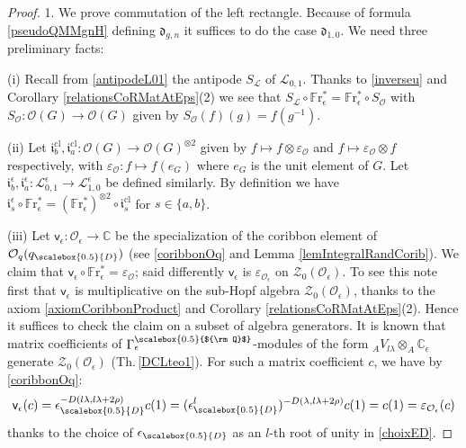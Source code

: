 \documentclass[11pt]{amsart}
\newcommand{\e}{\epsilon}
\newcommand{\qD}{q_{\scalebox{0.5}{D}}}
\newcommand{\eD}{\epsilon_{\scalebox{0.5}{D}}}
\newcommand{\Q}{{\scalebox{0.5}{${\rm Q}$}}}
\begin{document}
\begin{proof}
1. We prove commutation of the left rectangle. Because of formula \eqref{pseudoQMMgnH} defining $\mathfrak{d}_{g,n}$ it suffices to do the case $\mathfrak{d}_{1,0}$. We need three preliminary facts:

\indent (i) Recall from \eqref{antipodeL01} the antipode $S_{\mathcal{L}}$ of $\mathcal{L}_{0,1}$. Thanks to \eqref{inverseu} and Corollary \ref{relationsCoRMatAtEps}(2) we see that $S_{\mathcal{L}} \circ \mathbb{F}\mathrm{r}_\e^* = \mathbb{F}\mathrm{r}_\e^* \circ S_{\mathcal{O}}$ with $S_{\mathcal{O}} : \mathcal{O}(G) \to \mathcal{O}(G)$ given by $S_{\mathcal{O}}(f)(g) = f(g^{-1})$. 

\indent (ii) Let $\mathfrak{i}^{\mathrm{cl}}_{b}, \mathfrak{i}^{\mathrm{cl}}_{a} :\mathcal{O}(G) \to \mathcal{O}(G)^{\otimes 2}$ given by $f \mapsto f \otimes \varepsilon_{\mathcal{O}}$ and $f \mapsto \varepsilon_{\mathcal{O}} \otimes f$ respectively, with $\varepsilon_{\mathcal{O}} : f \mapsto f(e_G)$ where $e_G$ is the unit element of $G$. Let $\mathfrak{i}^{\e}_b, \mathfrak{i}^{\e}_a : \mathcal{L}_{0,1}^\e \to \mathcal{L}_{1,0}^\e$ be defined similarly. By definition we have $\mathfrak{i}^\e_s \circ \mathbb{F}\mathrm{r}_\e^* = (\mathbb{F}\mathrm{r}_\e^*)^{\otimes 2} \circ \mathfrak{i}_s^{\mathrm{cl}}$ for $s \in \{a,b\}$.

\indent (iii) Let $\mathsf{v}_{\e} : \mathcal{O}_{\e} \to \mathbb{C}$ be the specialization of the coribbon element of $\mathcal{O}_q(\qD)$ (see \eqref{coribbonOq} and Lemma \ref{lemIntegralRandCorib}). We claim that $\mathsf{v}_{\e} \circ \mathbb{F}\mathrm{r}_\e^* = \varepsilon_{\mathcal{O}}$; said differently $\mathsf{v}_{\e}$ is $\varepsilon_{\mathcal{O}_\e}$ on $\mathcal{Z}_0(\mathcal{O}_\e)$. To see this note first that $\mathsf{v}_{\e}$ is multiplicative on the sub-Hopf algebra $\mathcal{Z}_0(\mathcal{O}_\e)$, thanks to the axiom \eqref{axiomCoribbonProduct} and Corollary \ref{relationsCoRMatAtEps}(2). Hence it suffices to check the claim on a subset of algebra generators. It is known that matrix coefficients of $\Gamma_\e^\Q$-modules of the form $_AV_{l\lambda} \otimes_A \mathbb{C}_\e$ generate $\mathcal{Z}_0(\mathcal{O}_\e)$ (Th.\,\ref{DCLteo1}). For such a matrix coefficient $c$, we have by \eqref{coribbonOq}:
\[ \mathsf{v}_{\e}(c) = \eD^{-D(l\lambda, l\lambda + 2\rho)}c(1) = (\eD^l)^{-D(\lambda,l\lambda+2\rho)}c(1) = c(1) = \varepsilon_{\mathcal{O}_\e}(c) \]
thanks to the choice of $\eD$ as an $l$-th root of unity in \eqref{choixED}.


\end{proof}
\end{document}
